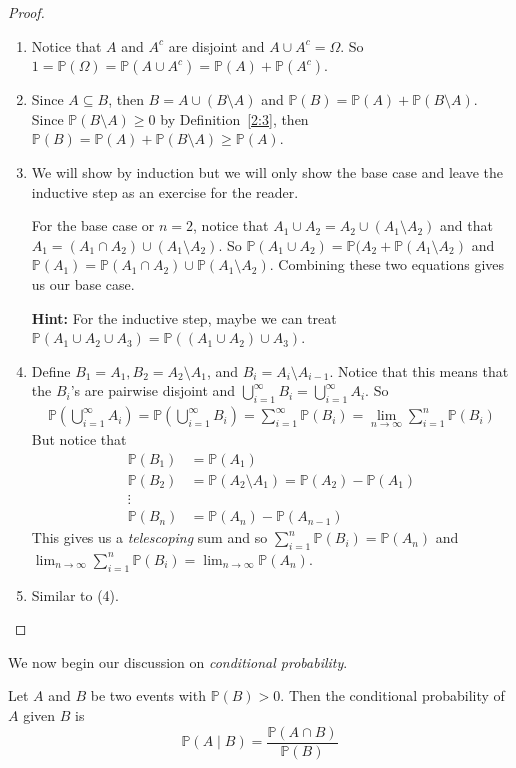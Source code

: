 \documentclass[notitlepage,abstract=on,twoside=semi]{scrartcl}
\newcommand{\om}{\ensuremath{\Omega}}
\newcommand{\Prob}{\ensuremath{\mathbb{P}}}
\begin{document}
\begin{proof}
  $ $\newline 
  \begin{enumerate}
  \item Notice that $A$ and $A^{c}$ are disjoint and $A \cup A^{c} = \om$. So
    $1 = \Prob(\om) = \Prob(A \cup A^{c}) = \Prob(A) + \Prob(A^{c})$.
    
  \item Since $A \subseteq B$, then $B = A \cup (B \setminus A)$ and $\Prob(B)
    = \Prob(A) + \Prob(B \setminus A)$. Since $\Prob(B \setminus A) \geq 0$ by
    Definition~\ref{2:3}, then $\Prob(B) = \Prob(A) + \Prob(B \setminus A) \geq
    \Prob(A)$.
  \item We will show by induction but we will only show the base case and leave
    the inductive step as an exercise for the reader.

    For the base case or $n = 2$, notice that $A_{1} \cup A_{2} = A_{2} \cup
    (A_{1} \setminus A_{2})$ and that $A_{1} = (A_{1} \cap A_{2}) \cup (A_{1}
    \setminus A_{2})$. So $\Prob(A_{1} \cup A_{2}) = \Prob(A_{2} + \Prob(A_{1}
    \setminus A_{2})$ and $\Prob(A_{1}) = \Prob(A_{1} \cap A_{2}) \cup \Prob(A_{1}
    \setminus A_{2})$. Combining these two equations gives us our base case.

    \textbf{Hint:} For the inductive step, maybe we can treat $\Prob(A_{1} \cup
    A_{2} \cup A_{3}) = \Prob((A_{1} \cup A_{2}) \cup A_{3})$.
  \item Define $B_{1} = A_{1}, B_{2} = A_{2} \setminus A_{1}$, and $B_{i} =
    A_{i} \setminus A_{i-1}$. Notice that this means that the $B_{i}$'s are
    pairwise disjoint and $\bigcup_{i=1}^{\infty}B_{i} =
    \bigcup_{i=1}^{\infty}A_{i}$. So
    \begin{align*}
      \Prob(\bigcup_{i=1}^{\infty}A_{i}) = \Prob(\bigcup_{i=1}^{\infty}B_{i}) =
      \sum_{i=1}^{\infty}\Prob(B_{i}) = \lim_{n \to \infty}
      \sum_{i=1}^{n}\Prob(B_{i})
    \end{align*}
    But notice that
    \begin{align*}
      \Prob(B_{1}) &= \Prob(A_{1}) \\
      \Prob(B_{2}) &= \Prob(A_{2} \setminus A_{1}) = \Prob(A_{2}) -
                     \Prob(A_{1}) \\
      \vdots \\
      \Prob(B_{n}) &= \Prob(A_{n}) - \Prob(A_{n-1})
    \end{align*}
    This gives us a \textit{telescoping} sum and so $\sum_{i=1}^{n}\Prob(B_{i})
    = \Prob(A_{n})$ and $\lim_{n \to \infty} \sum_{i=1}^{n}\Prob(B_{i}) =
    \lim_{n\to\infty}\Prob(A_{n})$.
  \item Similar to (4).
  \end{enumerate}
\end{proof}

We now begin our discussion on \textit{conditional probability}.
\begin{definition}
  \label{2:6}
  Let $A$ and $B$ be two events with $\Prob(B) > 0$. Then the conditional
  probability of $A$ given $B$ is
  \[
    \Prob(A \mid B) = \frac{\Prob(A \cap B)}{\Prob(B)}
  \]
\end{definition}
\end{document}
